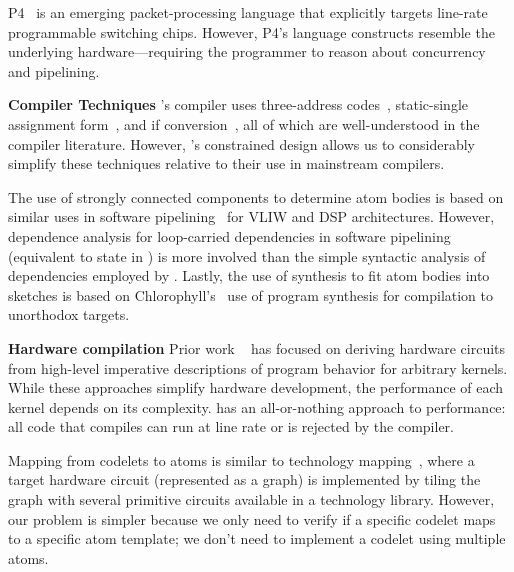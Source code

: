 P4~\cite{p4} is an emerging packet-processing language that explicitly targets
line-rate programmable switching chips. However, P4's language constructs
resemble the underlying hardware---requiring the programmer to reason about
concurrency and pipelining.

\textbf{Compiler Techniques}
\pktlanguage's compiler uses three-address codes~\cite{tac}, static-single
assignment form~\cite{ssa}, and if conversion~\cite{if_conversion}, all of
which are well-understood in the compiler literature. However, \pktlanguage's
constrained design allows us to considerably simplify these techniques relative
to their use in mainstream compilers.


The use of strongly connected components to determine atom bodies is based on
similar uses in software pipelining~\cite{software_pipelining} for VLIW and DSP
architectures. However, dependence analysis for loop-carried dependencies in
software pipelining (equivalent to state in \pktlanguage) is more involved than
the simple syntactic analysis of dependencies employed by \pktlanguage. Lastly,
the use of synthesis to fit atom bodies into sketches is based on
Chlorophyll's~\cite{chlorophyll} use of program synthesis for compilation to
unorthodox targets.

\textbf{Hardware compilation}
Prior work ~\cite{nurvadathi, cash, bluespec} has focused on deriving hardware
circuits from high-level imperative descriptions of program behavior for
arbitrary kernels. While these approaches simplify hardware development, the
performance of each kernel depends on its complexity.  \pktlanguage has an
all-or-nothing approach to performance: all code that compiles can run at
line rate or is rejected by the compiler.

Mapping from codelets to atoms is similar to technology mapping~\cite{micheli,
flowmap, spectransform}, where a target hardware circuit (represented as a
graph) is implemented by tiling the graph with several primitive circuits
available in a technology library. However, our problem is simpler because we
only need to verify if a specific codelet maps to a specific atom template; we
don't need to implement a codelet using multiple atoms.
